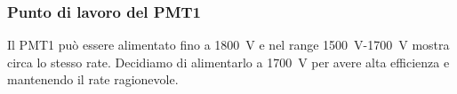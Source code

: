 \subsubsection{Punto di lavoro del PMT1}
Il PMT1 può essere alimentato fino a \SI{1800}{V} e nel range \SI{1500}{V}-\SI{1700}{V} mostra circa lo stesso rate. Decidiamo di alimentarlo a \SI{1700}{V} per avere alta efficienza e mantenendo il rate ragionevole.
